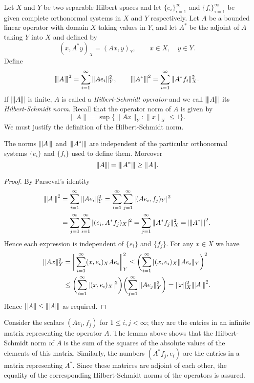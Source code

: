 \begin{para}
  Let $X$ and $Y$ be two separable Hilbert spaces and let $\{e_i\}_{i=1}^\infty$
  and $\{f_i\}_{i=1}^\infty$ be given complete orthonormal systems in $X$
  and $Y$ respectively. Let $A$ be a bounded linear operator with domain $X$
  taking values in $Y$, and let $A^*$ be the adjoint of $A$ taking $Y$ into $X$
  and defined by
  \[ (x,A^*y)_X = (Ax,y)_Y, \qquad x\in X,\quad y\in Y. \]
  Define
  \[ \opnorm{A}^2 = \sum_{i=1}^\infty \|Ae_i\|_Y^2,
      \qquad \opnorm{A^*}^2 = \sum_{i=1}^\infty \|A^* f_i\|_X^2. \]
  If $\opnorm{A}$ is finite, $A$ is called a \emph{Hilbert-Schmidt operator} and
  we call $\opnorm{A}$ its \emph{Hilbert-Schmidt norm}. Recall that the
  operator norm of $A$ is given by
  \[ \|A\| = \sup\{\|Ax\|_Y: \|x\|_X\leq 1\}. \]
  We must justify the definition of the Hilbert-Schmidt norm.
\end{para}


\begin{lemma}
  The norms $\opnorm{A}$ and $\opnorm{A^*}$ are independent of the particular
  orthonormal systems $\{e_i\}$ and $\{f_i\}$ used to define them. Moreover
  \[ \opnorm{A} = \opnorm{A^*} \geq \|A\|. \]
\end{lemma}

\begin{proof}
  By Parseval's identity
  \begin{align*}
    \opnorm{A}^2
    & = \sum_{i=1}^\infty \|Ae_i\|_Y^2
      = \sum_{i=1}^\infty \sum_{j=1}^\infty |(Ae_i,f_j)_Y|^2 \\
    & = \sum_{j=1}^\infty \sum_{i=1}^\infty |(e_i,A^*f_j)_X|^2
      = \sum_{j=1}^\infty \|A^*f_j\|_X^2 = \opnorm{A^*}^2.
  \end{align*}
  Hence each expression is independent of $\{e_i\}$ and $\{f_j\}$.
  For any $x\in X$ we have
  \begin{align*}
    \|Ax\|_Y^2
    & = \biggl\|\sum_{i=1}^\infty (x,e_i)_X Ae_i\biggr\|_Y^2
      \leq \biggl(\sum_{i=1}^\infty |(x,e_i)_X \|Ae_i\|_Y\biggr)^2 \\
    & \leq \biggl(\sum_{i=1}^\infty |(x,e_i)_X|^2\biggr)
        \biggl(\sum_{j=1}^\infty \|Ae_j\|_Y^2\biggr)
      = \|x\|_X^2 \opnorm{A}^2.
  \end{align*}
  Hence $\|A\|\leq \opnorm{A}$ as required.
\end{proof}


\begin{remark}
  Consider the scalars $(Ae_i,f_j)$ for $1\leq i,j<\infty$; they are the entries
  in an infinite matrix representing the operator $A$. The lemma above shows
  that the Hilbert-Schmidt norm of $A$ is the sum of the squares of the absolute
  values of the elements of this matrix. Similarly, the numbers $(A^*f_j,e_i)$
  are the entries in a matrix representing $A^*$. Since these matrices are adjoint
  of each other, the equality of the corresponding Hilbert-Schmidt norms of the
  operators is assured.
\end{remark}


